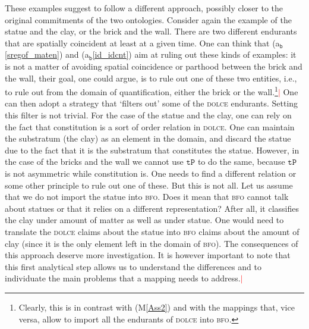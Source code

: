 \documentclass[ao]{iosart2x}
\newcommand{\nb}[1]{\textcolor{red}{$|$}\marginpar{\hspace*{-0cm}\parbox{20mm}{\scriptsize\raggedright\textcolor{red}{#1}}}}
\newcommand{\bfoAxLabel}{\textrm{a$_\texttt{b}$}}
\newcommand{\refbfoax}[1]{({\bfoAxLabel}\ref{#1})}
\newcommand{\pr}[1]{\mathtt{#1}}
\newcommand{\dolce}{{\textsc{dolce}}}
\newcommand{\bfo}{{\textsc{bfo}}}
\newcommand {\TPd} {\ensuremath{\pr{tP}}}
\begin{document}
These examples suggest to follow a different approach, possibly closer to the original commitments of the two ontologies. Consider again the example of the statue and the clay, or the brick and the wall. There are two different endurants that are spatially coincident at least at a given time. One can think that \refbfoax{sregof_maten} and \refbfoax{id_idcnt} aim at ruling out these kinds of examples: it is not a matter of avoiding spatial coincidence or parthood between the brick and the wall, their goal, one could argue, is to rule out one of these two entities, i.e., to rule out from the domain  of quantification, either the brick or the wall.\footnote{Clearly, this is in contrast with (M\ref{Ass2}) and with the mappings that, vice versa, allow to import all the endurants of {\dolce} into {\bfo}.}\nb{SB: il testo della nota mi confonde} One can then adopt a strategy that `filters out' some of the {\dolce} endurants. Setting this filter is not trivial. For the case of the statue and the clay, one can rely on the fact that constitution is a sort of order relation in {\dolce}. One can maintain the substratum (the clay) as an element in the domain, and discard the statue due to the fact that it is the substratum that constitutes the statue. However, in the case of the bricks and the wall we cannot use $\TPd$ to do the same, because $\TPd$ is not asymmetric while constitution is.
One needs to find a different relation or some other principle to rule out one of these. But this is not all. Let us assume that we do not import the statue into {\bfo}. Does it mean that {\bfo} cannot talk about statues or that it relies on a different representation? After all, it classifies the clay under amount of matter as well as under statue. One would need to translate the {\dolce} claims about the statue into {\bfo} claims about the amount of clay %
(since it is the only element left in the domain of {\bfo}). The consequences of this approach deserve more investigation. It is however important to note that this first analytical step allows us to understand the differences and to individuate the main problems that a mapping needs to address.\nb{CM: forse aggiungere qualche dettaglio su questo punto e sul come si re-identificano gli amounts of clay che nel tempo costituiscono la *stessa* statua}
\end{document}
